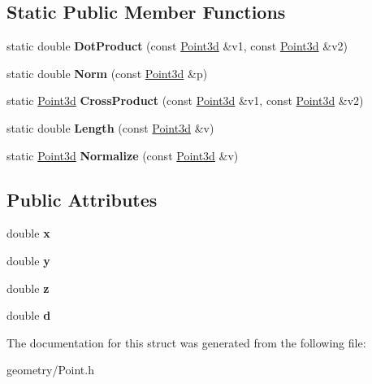 \subsection*{Static Public Member Functions}
\begin{DoxyCompactItemize}
\item 
\mbox{\label{struct_point3d_ae22c9787e429dfe10d08729f286ddc94}} 
static double {\bfseries Dot\+Product} (const \mbox{\hyperlink{struct_point3d}{Point3d}} \&v1, const \mbox{\hyperlink{struct_point3d}{Point3d}} \&v2)
\item 
\mbox{\label{struct_point3d_a0b4c494152c523e189e3c781f3c9736c}} 
static double {\bfseries Norm} (const \mbox{\hyperlink{struct_point3d}{Point3d}} \&p)
\item 
\mbox{\label{struct_point3d_a09f90c67877f7bb71355762e8ba833ec}} 
static \mbox{\hyperlink{struct_point3d}{Point3d}} {\bfseries Cross\+Product} (const \mbox{\hyperlink{struct_point3d}{Point3d}} \&v1, const \mbox{\hyperlink{struct_point3d}{Point3d}} \&v2)
\item 
\mbox{\label{struct_point3d_af9c710bb2cf8d8a6e3519ec8736c5843}} 
static double {\bfseries Length} (const \mbox{\hyperlink{struct_point3d}{Point3d}} \&v)
\item 
\mbox{\label{struct_point3d_aec6dbc891323d9449f6e3390701ec80b}} 
static \mbox{\hyperlink{struct_point3d}{Point3d}} {\bfseries Normalize} (const \mbox{\hyperlink{struct_point3d}{Point3d}} \&v)
\end{DoxyCompactItemize}
\subsection*{Public Attributes}
\begin{DoxyCompactItemize}
\item 
\mbox{\label{struct_point3d_af07eeaead059f4d97d57921b9d04aa66}} 
double {\bfseries x}
\item 
\mbox{\label{struct_point3d_a716403bba476bef8c1f5601542349e2c}} 
double {\bfseries y}
\item 
\mbox{\label{struct_point3d_ac833626685fb5706d279ea1347b7dc17}} 
double {\bfseries z}
\item 
\mbox{\label{struct_point3d_a60413a974fd1a2955cf5a3a60c33d448}} 
double {\bfseries d}
\end{DoxyCompactItemize}


The documentation for this struct was generated from the following file\+:\begin{DoxyCompactItemize}
\item 
geometry/Point.\+h\end{DoxyCompactItemize}
